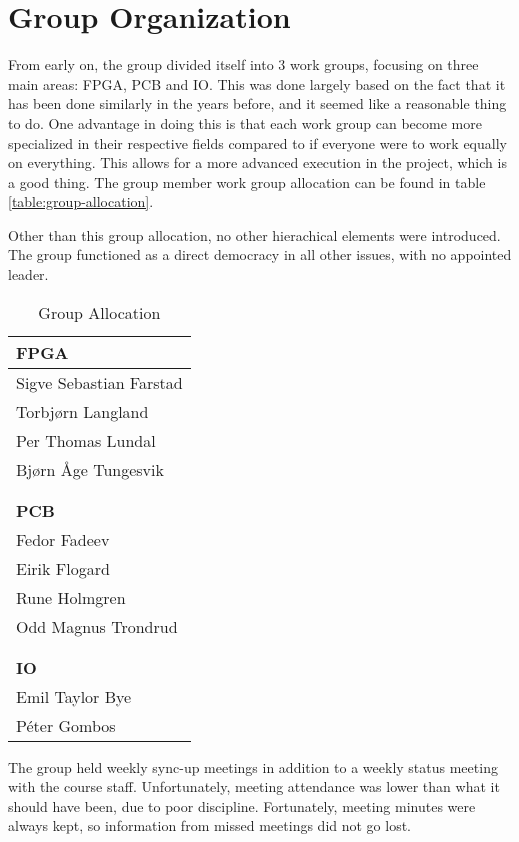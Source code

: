 \section{Group Organization}

From early on, the group divided itself into 3 work groups, focusing on three main areas: FPGA, PCB and IO.
This was done largely based on the fact that it has been done similarly in the years before\cn, and it seemed like a reasonable thing to do.
One advantage in doing this is that each work group can become more specialized in their respective fields compared to if everyone were to work equally on everything.
This allows for a more advanced execution in the project, which is a good thing.
The group member work group allocation can be found in table \vref{table:group-allocation}.

Other than this group allocation, no other hierachical elements were introduced.
The group functioned as a direct democracy in all other issues, with no appointed leader.

\begin{table}[H]
\begin{center}
\begin{tabular}{l}
\textbf{FPGA} \\
\hline
Sigve Sebastian Farstad \\
Torbjørn Langland \\
Per Thomas Lundal \\
Bjørn Åge Tungesvik \\
\\
\\
\textbf{PCB} \\
\hline
Fedor Fadeev \\
Eirik Flogard \\
Rune Holmgren \\
Odd Magnus Trondrud \\
\\
\\
\textbf{IO} \\
\hline
Emil Taylor Bye \\
Péter Gombos \\
\end{tabular}
\caption{Group Allocation}
\label{table:group-allocation}
\end{center}
\end{table}

The group held weekly sync-up meetings in addition to a weekly status meeting with the course staff.
Unfortunately, meeting attendance was lower than what it should have been, due to poor discipline.
Fortunately, meeting minutes were always kept, so information from missed meetings did not go lost.

